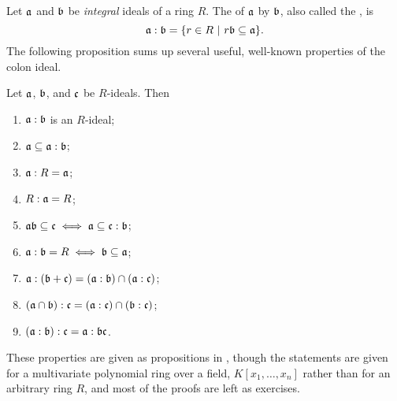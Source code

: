 Let $\frak a$ and $\frak b$ be \emph{integral} ideals of a ring $R$.
The  of $\frak a$ by $\frak b$, also called the , is
\[ \frak a : \frak b = \{ r \in R ~|~ r \frak b \subseteq \frak a \}. \]
The following proposition sums up several useful, well-known properties of the colon ideal.
\begin{proposition}
  Let $\frak a$, $\frak b$, and $\frak c$ be $R$-ideals. Then
  \begin{enumerate}[label=(\roman*)]
    \item $\frak a : \frak b$ is an $R$-ideal;
    \item $\frak a \subseteq \frak a : \frak b$;
    \item $\frak a : R = \frak a$;
    \item $R : \frak a = R$;
    \item $\frak a \frak b \subseteq \frak c \iff \frak a \subseteq \frak c : \frak b$;
    \item $\frak a : \frak b = R \iff \frak b \subseteq \frak a$;
    \item $\frak a : (\frak b + \frak c) = (\frak a : \frak b) \cap (\frak a : \frak c)$;
    \item $(\frak a \cap \frak b) : \frak c = (\frak a : \frak c) \cap (\frak b : \frak c)$;
    \item $(\frak a : \frak b) : \frak c = \frak a : \frak b \frak c$.
  \end{enumerate}
\end{proposition}
These properties are given as propositions in \cite{cox07},
though the statements are given for a multivariate polynomial ring over a field, $K[x_1, \ldots, x_n]$
rather than for an arbitrary  ring  $R$,
and most of the proofs are left as exercises.

